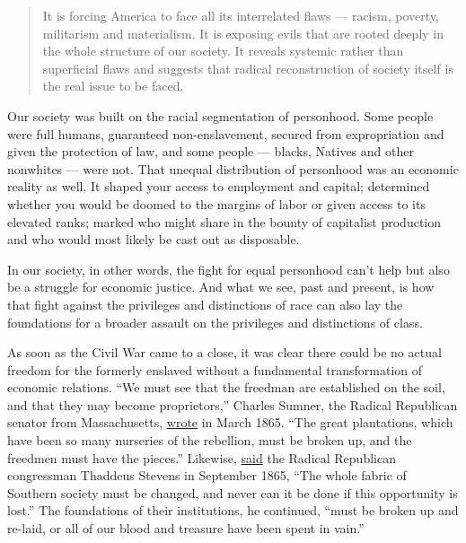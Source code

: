 \begin{quote}
It is forcing America to face all its interrelated flaws --- racism,
poverty, militarism and materialism. It is exposing evils that are
rooted deeply in the whole structure of our society. It reveals systemic
rather than superficial flaws and suggests that radical reconstruction
of society itself is the real issue to be faced.
\end{quote}

Our society was built on the racial segmentation of personhood. Some
people were full humans, guaranteed non-enslavement, secured from
expropriation and given the protection of law, and some people ---
blacks, Natives and other nonwhites --- were not. That unequal
distribution of personhood was an economic reality as well. It shaped
your access to employment and capital; determined whether you would be
doomed to the margins of labor or given access to its elevated ranks;
marked who might share in the bounty of capitalist production and who
would most likely be cast out as disposable.

In our society, in other words, the fight for equal personhood can't
help but also be a struggle for economic justice. And what we see, past
and present, is how that fight against the privileges and distinctions
of race can also lay the foundations for a broader assault on the
privileges and distinctions of class.

As soon as the Civil War came to a close, it was clear there could be no
actual freedom for the formerly enslaved without a fundamental
transformation of economic relations. ``We must see that the freedman
are established on the soil, and that they may become proprietors,''
Charles Sumner, the Radical Republican senator from Massachusetts,
\href{https://www.google.com/books/edition/Black_Reconstruction_in_America/DmymDwAAQBAJ?hl=en\&gbpv=1\&dq=black\%20reconstruction\&pg=PA177\&printsec=frontcover\&bsq=\%E2\%80\%9Cwe\%20must\%20see\%20that\%20the\%20freedmen\%E2\%80\%9D}{wrote}
in March 1865. ``The great plantations, which have been so many
nurseries of the rebellion, must be broken up, and the freedmen must
have the pieces.'' Likewise,
\href{https://www.google.com/books/edition/Black_Reconstruction_in_America/DmymDwAAQBAJ?hl=en\&gbpv=1\&dq=black\%20reconstruction\&pg=PA176\&printsec=frontcover\&bsq=\%E2\%80\%9Cspent\%20in\%20vain\%E2\%80\%9D}{said}
the Radical Republican congressman Thaddeus Stevens in September 1865,
``The whole fabric of Southern society must be changed, and never can it
be done if this opportunity is lost.'' The foundations of their
institutions, he continued, ``must be broken up and re-laid, or all of
our blood and treasure have been spent in vain.''

